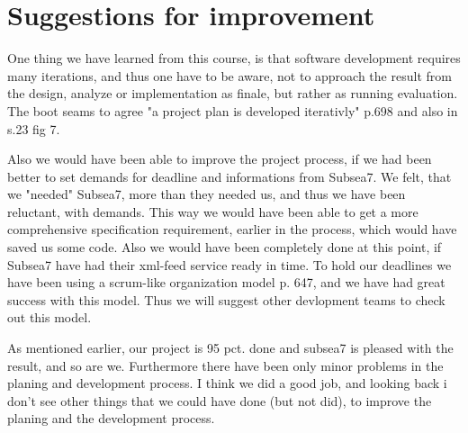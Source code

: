 \section{Suggestions for improvement}
One thing we have learned from this course, is that software development requires many iterations,
and thus one have to be aware, not to approach the result from the design, analyze or implementation
as finale, but rather as running evaluation. The boot seams to agree "a project plan is
developed iterativly"\cite{oose} p.698 and also in \cite{mad-article} s.23 fig 7.

Also we would have been able to improve the project process, if we had been better to set demands
for deadline and informations from Subsea7. We felt, that we "needed" Subsea7, more than
they needed us, and thus we have been reluctant, with demands. This way we would have been able
to get a more comprehensive specification requirement, earlier in the process, which would have
saved us some code. Also we would have been completely done at this point, if Subsea7 have had
their xml-feed service ready in time. To hold our deadlines we have been using a scrum-like
organization model \cite{oose} p. 647, and we have had great success with this model. Thus we will
suggest other devlopment teams to check out this model.

As mentioned earlier, our project is 95 pct. done and subsea7 is pleased with the result, and so are we.
Furthermore there have been only minor problems in the planing and development process. I think we
did a good job, and looking back i don't see other things that we could have done (but not did),
to improve the planing and the development process.


